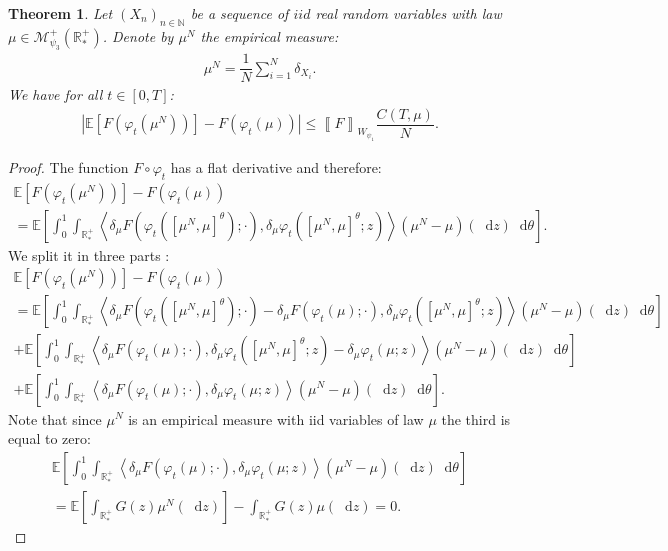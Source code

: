 \documentclass[11pt,a4paper]{article}
\newcommand{\RRP}{\mathbb{R}^+_*}
\newcommand{\MC}{\mathcal{M}}
\newcommand{\E}[1]{\mathbb{E}\left[#1\right]}
\newcommand{\Seq}[1]{\left(#1\right)_{n\in \mathbb{N}}}
\newcommand{\brac}[1]{\left\langle#1\right\rangle}
\newcommand{\dd}{\mathop{}\!\mathrm{d}}
\newtheorem{theorem}{Theorem}[section]
\begin{document}
\begin{theorem}
    Let $\Seq{X_n}$ be a sequence of $iid$ real random variables with law $\mu \in \MC^+_{\psi_3}(\RRP)$. Denote by $\mu^N$ the empirical measure:
    \begin{align*}
        \mu^N = \dfrac{1}{N} \sum\limits_{i = 1}^N \delta_{X_i}.
    \end{align*}
    We have for all $t \in [0,T]$:
    \begin{align*}
        \left| \E{F\left(\varphi_t(\mu^N)\right)} - F\left(\varphi_t(\mu)\right)\right| \leq \left\llbracket F \right\rrbracket_{W_{\psi_1}} \dfrac{C(T,\mu)}{N}.
    \end{align*}
\end{theorem}
\begin{proof}
    The function $F\circ \varphi_t$ has a flat derivative and therefore:
    \begin{multline*}
        \E{F\left(\varphi_t(\mu^N)\right)} - F\left(\varphi_t(\mu)\right) \\
        = \E{\int_0^1 \int_{\RRP} \brac{\delta_\mu F\left(\varphi_t \left(\left[\mu^N,\mu \right]^\theta\right);\cdot \right), \delta_\mu \varphi_t\left(\left[\mu^N,\mu \right]^\theta;z \right)} \left(\mu^N - \mu\right)(\dd z)\dd \theta}.
    \end{multline*}
    We split it in three parts :
    \begin{multline*}
        \E{F\left(\varphi_t(\mu^N)\right)} - F\left(\varphi_t(\mu)\right) \\
        = \E{\int_0^1 \int_{\RRP} \brac{\delta_\mu F\left(\varphi_t \left(\left[\mu^N,\mu \right]^\theta\right);\cdot \right)- \delta_\mu F\left(\varphi_t \left(\mu\right);\cdot \right), \delta_\mu \varphi_t\left(\left[\mu^N,\mu \right]^\theta;z \right)} \left(\mu^N - \mu\right)(\dd z)\dd \theta} \\
        + \E{\int_0^1 \int_{\RRP} \brac{\delta_\mu F\left(\varphi_t \left(\mu\right);\cdot \right), \delta_\mu \varphi_t\left(\left[\mu^N,\mu \right]^\theta;z \right) -  \delta_\mu \varphi_t\left(\mu;z \right)} \left(\mu^N - \mu\right)(\dd z)\dd \theta} \\
        + \E{\int_0^1 \int_{\RRP} \brac{\delta_\mu F\left(\varphi_t \left(\mu\right);\cdot \right), \delta_\mu \varphi_t\left(\mu;z \right)} \left(\mu^N - \mu\right)(\dd z)\dd \theta}.
    \end{multline*}
    Note that since $\mu^N$ is an empirical measure with iid variables of law $\mu$ the third is equal to zero:
    \begin{multline*}
        \E{\int_0^1 \int_{\RRP} \brac{\delta_\mu F\left(\varphi_t \left(\mu\right);\cdot \right), \delta_\mu \varphi_t\left(\mu;z \right)} \left(\mu^N - \mu\right)(\dd z)\dd \theta} \\
        = \E{\int_{\RRP}G(z) \mu^N(\dd z) } - \int_{\RRP} G(z)\mu(\dd z) = 0.
    \end{multline*}


\end{proof}
\end{document}
